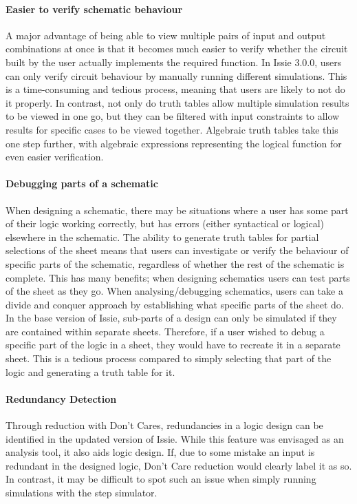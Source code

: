 \paragraph{Easier to verify schematic behaviour} A major advantage of being able to view multiple pairs of input and output combinations at once is that it becomes much easier to verify whether the circuit built by the user actually implements the required function. In Issie 3.0.0, users can only verify circuit behaviour by manually running different simulations. This is a time-consuming and tedious process, meaning that users are likely to not do it properly. In contrast, not only do truth tables allow multiple simulation results to be viewed in one go, but they can be filtered with input constraints to allow results for specific cases to be viewed together. Algebraic truth tables take this one step further, with algebraic expressions representing the logical function for even easier verification.

\paragraph{Debugging parts of a schematic} When designing a schematic, there may be situations where a user has some part of their logic working correctly, but has errors (either syntactical or logical) elsewhere in the schematic. The ability to generate truth tables for partial selections of the sheet means that users can investigate or verify the behaviour of specific parts of the schematic, regardless of whether the rest of the schematic is complete. This has many benefits; when designing schematics users can test parts of the sheet as they go. When analysing/debugging schematics, users can take a divide and conquer approach by establishing what specific parts of the sheet do. In the base version of Issie, sub-parts of a design can only be simulated if they are contained within separate sheets. Therefore, if a user wished to debug a specific part of the logic in a sheet, they would have to recreate it in a separate sheet. This is a tedious process compared to simply selecting that part of the logic and generating a truth table for it.

\paragraph{Redundancy Detection} Through reduction with Don't Cares, redundancies in a logic design can be identified in the updated version of Issie. While this feature was envisaged as an analysis tool, it also aids logic design. If, due to some mistake an input is redundant in the designed logic, Don't Care reduction would clearly label it as so. In contrast, it may be difficult to spot such an issue when simply running simulations with the step simulator.

